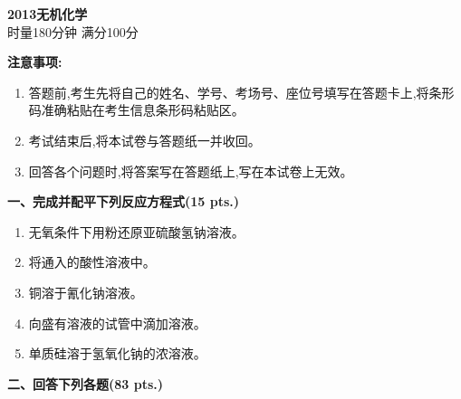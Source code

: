 \begin{center}
    {\LARGE \textbf{2013无机化学}} \\[2ex]
    {\large 时量180分钟 \quad 满分100分}
\end{center}

\vspace{0.5cm}
\noindent\textbf{注意事项:}
\begin{enumerate}[label=\arabic*., parsep=0pt, itemsep=0pt]
    \item 答题前,考生先将自己的姓名、学号、考场号、座位号填写在答题卡上,将条形码准确粘贴在考生信息条形码粘贴区。
    \item 考试结束后,将本试卷与答题纸一并收回。
    \item 回答各个问题时,将答案写在答题纸上,写在本试卷上无效。
\end{enumerate}

\vspace{0.5cm}
\noindent\textbf{一、完成并配平下列反应方程式(15 pts.)}

\begin{enumerate}[label=\arabic*., start=1, itemsep=1.5ex]
    \item 无氧条件下用粉还原亚硫酸氢钠溶液。
    \item 将通入的酸性溶液中。
    \item 铜溶于氰化钠溶液。
    \item 向盛有溶液的试管中滴加溶液。
    \item 单质硅溶于氢氧化钠的浓溶液。
\end{enumerate}

\vspace{0.5cm}
\noindent\textbf{二、回答下列各题(83 pts.)}

